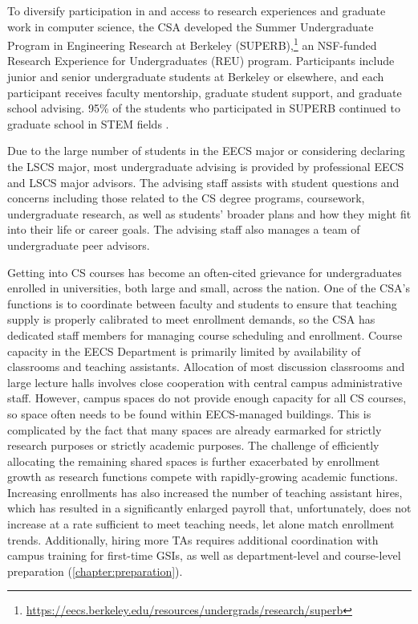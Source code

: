 To diversify participation in and access to research experiences and graduate work in computer science, the CSA developed the Summer Undergraduate Program in Engineering Research at Berkeley (SUPERB),\footnote{\url{https://eecs.berkeley.edu/resources/undergrads/research/superb}} an NSF-funded Research Experience for Undergraduates (REU) program. Participants include junior and senior undergraduate students at Berkeley or elsewhere, and each participant receives faculty mentorship, graduate student support, and graduate school advising. 95\% of the students who participated in SUPERB continued to graduate school in STEM fields \cite{Alivisatos:2017}.

Due to the large number of students in the EECS major or considering declaring the LSCS major, most undergraduate advising is provided by professional EECS and LSCS major advisors. The advising staff assists with student questions and concerns including those related to the CS degree programs, coursework, undergraduate research, as well as students' broader plans and how they might fit into their life or career goals. The advising staff also manages a team of undergraduate peer advisors.

Getting into CS courses has become an often-cited grievance for undergraduates enrolled in universities, both large and small, across the nation. One of the CSA's functions is to coordinate between faculty and students to ensure that teaching supply is properly calibrated to meet enrollment demands, so the CSA has dedicated staff members for managing course scheduling and enrollment. Course capacity in the EECS Department is primarily limited by availability of classrooms and teaching assistants. Allocation of most discussion classrooms and large lecture halls involves close cooperation with central campus administrative staff. However, campus spaces do not provide enough capacity for all CS courses, so space often needs to be found within EECS-managed buildings. This is complicated by the fact that many spaces are already earmarked for strictly research purposes or strictly academic purposes. The challenge of efficiently allocating the remaining shared spaces is further exacerbated by enrollment growth as research functions compete with rapidly-growing academic functions. Increasing enrollments has also increased the number of teaching assistant hires, which has resulted in a significantly enlarged payroll that, unfortunately, does not increase at a rate sufficient to meet teaching needs, let alone match enrollment trends. Additionally, hiring more TAs requires additional coordination with campus training for first-time GSIs, as well as department-level and course-level preparation (\autoref{chapter:preparation}).

